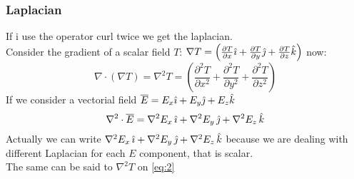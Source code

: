 \subsubsection*{Laplacian}\label{sec:laplacian}
If i use the operator curl twice we get the laplacian.\\
Consider the gradient of a scalar field $T$: $\nabla T=\left(\frac{\partial T}{\partial x}\hat{\imath}+\frac{\partial T}{\partial y}\hat{\jmath}+\frac{\partial T}{\partial z}\hat{\mathnormal{k}}\right)$ now:
\begin{equation}\label{eq:2}
\nabla\cdot(\nabla T)=\nabla^2T=\left(\frac{\partial^2 T}{\partial x^2}+\frac{\partial^2 T}{\partial y^2}+\frac{\partial^2 T}{\partial z^2}\right)
\end{equation}
If we consider a vectorial field $\overline{E}=E_x \hat{\imath} + E_y \hat{\jmath} + E_z \hat{\mathnormal{k}}$
\begin{equation}
\nabla^2\cdot \overline{E}= \nabla^2E_x\,\hat{\imath}+\nabla^2E_y\,\hat{\jmath}+\nabla^2E_z\,\hat{\mathnormal{k}}
\end{equation}
Actually we can write $\nabla^2E_x\,\hat{\imath}+\nabla^2E_y\,\hat{\jmath}+\nabla^2E_z\,\hat{\mathnormal{k}}$ because we are dealing with different Laplacian for each $E$ component, that is scalar.\\
The same can be said to $\nabla^2 T$ on \cref{eq:2}
